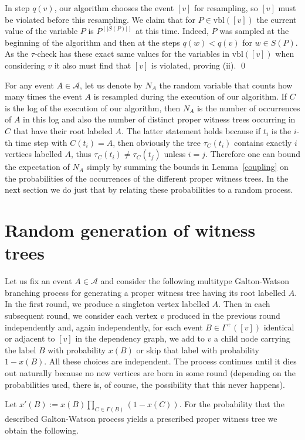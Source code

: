 \documentclass[11pt,a4paper]{article}
\begin{document}
In step $q(v)$, our algorithm chooses the event
$[v]$ for resampling, so $[v]$ must be violated before this resampling. We claim that for $P\in\mbox{vbl}([v])$ the
current value of the variable $P$ is $P^{(|S(P)|)}$ at this time. Indeed,
$P$ was sampled at the beginning of the algorithm and then at the steps
$q(w)<q(v)$ for $w\in S(P)$. As the $\tau$-check has these exact same values
for the variables in $\mbox{vbl}([v])$ when considering $v$ it also must find
that $[v]$ is violated, proving (ii). \qed

For any event $A \in \mathcal{A}$, let us denote by $N_A$ the random variable
that counts how many times the event $A$ is resampled during the execution of
our algorithm. If $C$ is the log of the execution of our algorithm, then $N_A$
is the number of occurrences of $A$ in this log and also the number of distinct
proper witness trees occurring in $C$ that have their root labeled $A$. The
latter statement holds because if $t_i$ is the $i$-th time step
with $C(t_i)=A$, then obviously the tree $\tau_C(t_i)$ contains exactly $i$
vertices labelled $A$, thus $\tau_C(t_i)\ne\tau_C(t_j)$ unless
$i=j$. Therefore one can bound the expectation of $N_A$ simply by summing the
bounds in Lemma~\ref{coupling} on the probabilities of the occurrences of the
different proper witness trees. In the next section we do just that by
relating these probabilities to a random process.

\section{Random generation of witness trees}

Let us fix an event $A \in \mathcal{A}$ and consider the following multitype
Galton-Watson branching process for generating a proper witness tree having its root labelled $A$. 
In the first round, we produce a singleton vertex labelled $A$. Then in each subsequent round, we consider each vertex $v$ produced in the
previous round independently and, again independently, for each event $B \in \Gamma^+([v])$ identical or adjacent to $[v]$ in the dependency graph, 
we add to $v$ a child node carrying the label $B$ with probability $x(B)$ or
skip that label with probability $1-x(B)$. All these choices are independent. The process continues until
it dies out naturally because no new vertices are born in some round (depending on the probabilities used, there is, of course, the possibility that
this never happens).

Let $x'(B):=x(B)\prod_{C\in\Gamma(B)}(1-x(C))$. For the probability that the
described Galton-Watson process yields a prescribed proper witness tree
we obtain the following.
\end{document}
